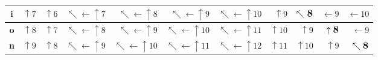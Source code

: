 \documentclass[dvisvgm,tikz,10pt]{standalone}
\begin{document}
\begin{tabular}{|c|r|r|r|r|r|r|r|r|r|r|}
  \hline
  \textbf{i} & $\uparrow 7$ & $\uparrow 6$ & $\nwarrow\leftarrow\uparrow 7$ & $\nwarrow\leftarrow\uparrow 8$ & $\nwarrow\leftarrow\uparrow 9$ & $\nwarrow\leftarrow\uparrow 10$ & $\uparrow  9$ & \cellcolor{LightCyan}$\nwarrow \textbf{\large 8}$ & $\leftarrow 9$ & $\leftarrow 10$ \\
  \hline
  \textbf{o} & $\uparrow 8$ & $\uparrow 7$ & $\nwarrow\leftarrow\uparrow 8$ & $\nwarrow\leftarrow\uparrow 9$ & $\nwarrow\leftarrow\uparrow 10$ & $\nwarrow\leftarrow\uparrow 11$ & $\uparrow 10$ & $\uparrow 9$ & \cellcolor{LightCyan}$\uparrow \textbf{\large 8}$ & $\leftarrow 9$ \\
  \hline
  \textbf{n} & $\uparrow 9$ & $\uparrow 8$ & $\nwarrow\leftarrow\uparrow 9$ & $\nwarrow\leftarrow\uparrow 10$ & $\nwarrow\leftarrow\uparrow 11$ & $\nwarrow\leftarrow\uparrow 12$ & $\uparrow 11$ & $\uparrow 10$ & $\uparrow 9$ & \cellcolor{LightCyan}$\nwarrow \textbf{\large 8}$ \\
  \hline
\end{tabular}
\egroup
\end{document}
